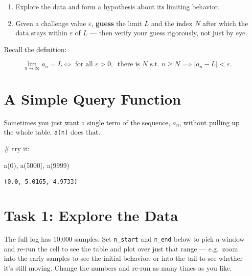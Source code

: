 \documentclass[
  letterpaper,
  DIV=11,
  numbers=noendperiod]{scrreprt}
\newenvironment{Shaded}{\begin{snugshade}}{\end{snugshade}}
\newcommand{\CommentTok}[1]{\textcolor[rgb]{0.37,0.37,0.37}{#1}}
\newcommand{\DecValTok}[1]{\textcolor[rgb]{0.68,0.00,0.00}{#1}}
\newcommand{\NormalTok}[1]{\textcolor[rgb]{0.00,0.23,0.31}{#1}}
\providecommand{\tightlist}{%
  \setlength{\itemsep}{0pt}\setlength{\parskip}{0pt}}
\theoremstyle{plain}
\theoremstyle{plain}
\theoremstyle{definition}
\theoremstyle{definition}
\theoremstyle{definition}
\theoremstyle{plain}
\theoremstyle{plain}
\theoremstyle{remark}
\begin{document}
\begin{enumerate}
\def\labelenumi{\arabic{enumi}.}
\tightlist
\item
  Explore the data and form a hypothesis about its limiting behavior.
\item
  Given a challenge value \(\varepsilon\), \textbf{guess} the limit
  \(L\) and the index \(N\) after which the data stays within
  \(\varepsilon\) of \(L\) --- then verify your guess rigorously, not
  just by eye.
\end{enumerate}

Recall the definition:

\[ \lim_{n\to\infty} a_n = L \iff \text{ for all } \varepsilon>0,\ \text{ there is } N \text{ s.t. } n\ge N \implies |a_n-L|<\varepsilon. \]

\section{A Simple Query Function}\label{a-simple-query-function}

Sometimes you just want a single term of the sequence, \(a_n\), without
pulling up the whole table. \texttt{a(n)} does that.

\begin{Shaded}
\begin{Highlighting}[]
\CommentTok{\# try it:}

\NormalTok{a(}\DecValTok{0}\NormalTok{), a(}\DecValTok{5000}\NormalTok{), a(}\DecValTok{9999}\NormalTok{)}
\end{Highlighting}
\end{Shaded}

\begin{verbatim}
(0.0, 5.0165, 4.9733)
\end{verbatim}

\section{Task 1: Explore the Data}\label{task-1-explore-the-data}

The full log has 10,000 samples. Set \texttt{n\_start} and
\texttt{n\_end} below to pick a window and re-run the cell to see the
table and plot over just that range --- e.g.~zoom into the early samples
to see the initial behavior, or into the tail to see whether it's still
moving. Change the numbers and re-run as many times as you like.
\end{document}
